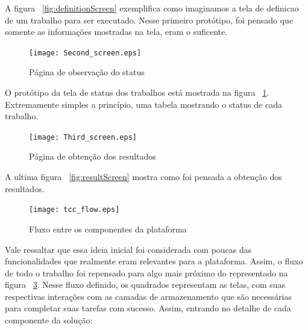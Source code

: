 \documentclass[11pt,twoside]{article}
\begin{document}
A figura ~\ref{fig:definitionScreen} exemplifica como imaginamos a tela de definicao de um trabalho para ser executado. Nesse primeiro protótipo, foi pensado que somente 
as informações mostradas na tela, eram o suficente.

\begin{figure}[!h]
  \centering
  \texttt{[image: Second\_screen.eps]}
  \caption{Página de observação do status}
  \label{fig:statusScreen}
\end{figure}


O protótipo da tela de status dos trabalhos está mostrada na figura ~\ref{fig:statusScreen}. Extremamente simples a princípio, uma tabela mostrando o status de cada trabalho. 

\begin{figure}[!h]
  \centering
  \texttt{[image: Third\_screen.eps]}
  \caption{Página de obtenção dos resultados}
  \label{fig:resultsScreen}
\end{figure}

A ultima figura ~\ref{fig:resultScreen} mostra como foi pensada a obtenção dos resultados.

\begin{figure}[!h]
  \centering
  \texttt{[image: tcc\_flow.eps]}
  \caption{Fluxo entre os componentes da plataforma}
  \label{fig:flowScreen}
\end{figure}

Vale ressaltar que essa ideia inicial foi considerada com poucas das funcionalidades que realmente eram relevantes para a plataforma. Assim, o fluxo de todo o trabalho foi 
repensado para algo mais próximo do representado na figura ~\ref{fig:flowScreen}. Nesse fluxo definido, os quadrados representam as telas, com suas respectivas interações com 
as camadas de armazenamento que são necessárias para completar suas tarefas com sucesso. Assim, entrando no detalhe de cada componente da solução:
\end{document}
